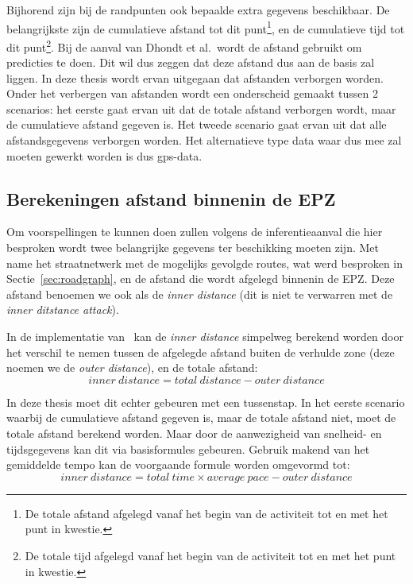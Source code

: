Bijhorend zijn bij de randpunten ook bepaalde extra gegevens beschikbaar. De
belangrijkste zijn de cumulatieve afstand tot dit punt\footnote{De totale
    afstand afgelegd vanaf het begin van de activiteit tot en met het punt in
    kwestie.}, en de cumulatieve tijd tot dit punt\footnote{De totale tijd afgelegd
    vanaf het begin van de activiteit tot en met het punt in kwestie.}. Bij de
aanval van Dhondt et al.\ wordt de afstand gebruikt om predicties te doen. Dit
wil dus zeggen dat deze afstand dus aan de basis zal liggen. In deze thesis
wordt ervan uitgegaan dat afstanden verborgen worden. Onder het verbergen van
afstanden wordt een onderscheid gemaakt tussen 2 scenarios: het eerste gaat
ervan uit dat de totale afstand verborgen wordt, maar de cumulatieve afstand
gegeven is. Het tweede scenario gaat ervan uit dat alle afstandsgegevens
verborgen worden. Het alternatieve type data waar dus mee zal moeten gewerkt
worden is dus \ac{gps}-data.

\subsection{Berekeningen afstand binnenin de EPZ}\label{sec:berekeningen}
Om voorspellingen te kunnen doen zullen volgens de inferentieaanval die hier
besproken wordt twee belangrijke gegevens ter beschikking moeten zijn. Met name
het straatnetwerk met de mogelijks gevolgde routes, wat werd besproken in
Sectie~\ref{sec:roadgraph}, en de afstand die wordt afgelegd binnenin de
\ac{EPZ}. Deze afstand benoemen we ook als de \textit{inner distance} (dit is
niet te verwarren met de \textit{inner ditstance attack}).

In de implementatie van~\citeauthor{Dhondt} kan de \textit{inner distance}
simpelweg berekend worden door het verschil te nemen tussen de afgelegde
afstand buiten de verhulde zone (deze noemen we de \textit{outer distance}), en
de totale afstand: \[inner\ distance = total\
    distance - outer\ distance \]

In deze thesis moet dit echter gebeuren met een tussenstap. In het eerste
scenario waarbij de cumulatieve afstand gegeven is, maar de totale afstand
niet, moet de totale afstand berekend worden. Maar door de aanwezigheid van
snelheid- en tijdsgegevens kan dit via basisformules gebeuren. Gebruik makend
van het gemiddelde tempo kan de voorgaande formule worden omgevormd tot: \[inner\ distance = total\ time \times average\ pace - outer\ distance \]

